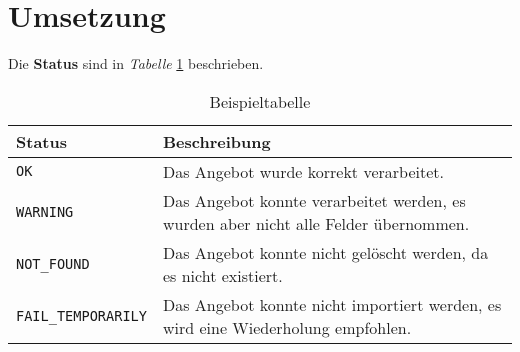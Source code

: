 \section{Umsetzung}
\label{chapter:umsetzung}

Die \textbf{Status} sind in \textit{Tabelle} \ref{tab:beispiel} beschrieben. 

\begin{table}[!ht]
\centering
\begin{tabular}{l p{8cm} } 
  \toprule
\textbf{Status} & \textbf{Beschreibung} \\ \midrule
  \texttt{OK} & Das Angebot wurde korrekt verarbeitet. \\
  \texttt{WARNING} & Das Angebot konnte verarbeitet werden, es wurden aber nicht alle Felder übernommen. \\
  \texttt{NOT\_FOUND} & Das Angebot konnte nicht gelöscht werden, da es nicht existiert. \\
  \texttt{FAIL\_TEMPORARILY} & Das Angebot konnte nicht importiert werden, es wird eine Wiederholung empfohlen. \\
\bottomrule
\end{tabular} 
\caption{Beispieltabelle}
\label{tab:beispiel}
\end{table}

